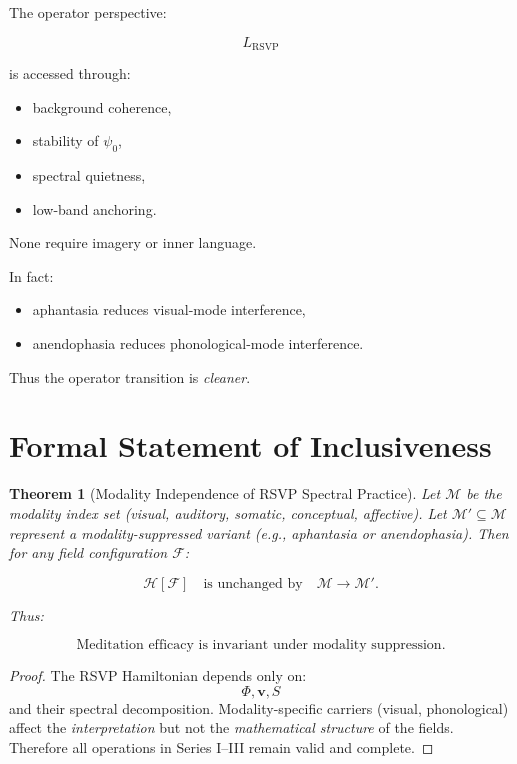 \documentclass[12pt]{article}
\newtheorem{theorem}{Theorem}[section]
\begin{document}
The operator perspective:

\[
L_{\text{RSVP}}
\]

is accessed through:

\begin{itemize}
    \item background coherence,
    \item stability of $\psi_0$,
    \item spectral quietness,
    \item low-band anchoring.
\end{itemize}

None require imagery or inner language.

In fact:

\begin{itemize}
    \item aphantasia reduces visual-mode interference,  
    \item anendophasia reduces phonological-mode interference.
\end{itemize}

Thus the operator transition is \emph{cleaner}.

\section{Formal Statement of Inclusiveness}

\begin{theorem}[Modality Independence of RSVP Spectral Practice]
Let $\mathcal{M}$ be the modality index set
(visual, auditory, somatic, conceptual, affective).
Let $\mathcal{M}' \subseteq \mathcal{M}$ represent a modality-suppressed variant
(e.g., aphantasia or anendophasia).
Then for any field configuration $\mathcal{F}$:

\[
\mathcal{H}[\mathcal{F}]
\quad \text{is unchanged by}
\quad \mathcal{M} \to \mathcal{M}'.
\]

Thus:

\[
\text{Meditation efficacy is invariant under modality suppression.}
\]
\end{theorem}

\begin{proof}
The RSVP Hamiltonian depends only on:
\[
\Phi, \mathbf{v}, S
\]
and their spectral decomposition.  
Modality-specific carriers (visual, phonological) affect the \emph{interpretation} but not the \emph{mathematical structure} of the fields.  
Therefore all operations in Series I–III remain valid and complete.
\end{proof}
\end{document}
